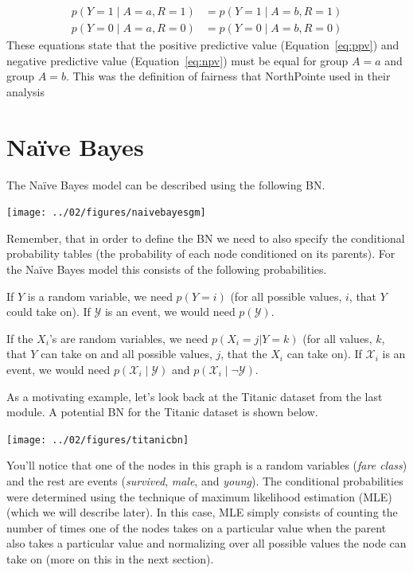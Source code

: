 \documentclass{tufte-handout}
\begin{document}
\begin{align}
p(Y=1 \mid A=a, R=1) &= p(Y=1 \mid A=b, R=1) \label{eq:ppv} \\
p(Y=0 \mid A=a, R=0) &= p(Y=0 \mid A=b, R=0) \label{eq:npv}
\end{align}
These equations state that the positive predictive value (Equation~\ref{eq:ppv}) and negative predictive value (Equation~\ref{eq:npv}) must be equal for group $A=a$ and group $A=b$.  This was the definition of fairness that NorthPointe used in their analysis
\ei

\section{Na\"ive Bayes}

The Na\"ive Bayes model can be described using the following BN.

\begin{center}
\texttt{[image: ../02/figures/naivebayesgm]}
\end{center}

Remember, that in order to define the BN we need to also specify the conditional probability tables (the probability of each node conditioned on its parents).  For the Na\"ive Bayes model this consists of the following probabilities.

\bi
\item If $Y$ is a random variable, we need $p(Y=i)$ (for all possible values, $i$, that $Y$ could take on).  If $\mathcal{Y}$ is an event, we would need $p(\mathcal{Y})$.
\item If the $X_i$'s are random variables, we need $p(X_i=j | Y=k)$ (for all values, $k$, that $Y$ can take on and all possible values, $j$, that the $X_i$ can take on).  If $\mathcal{X}_i$ is an event, we would need $p(\mathcal{X}_i \mid \mathcal{Y})$ and $p(\mathcal{X}_i \mid \neg \mathcal{Y})$.
\ei

As a motivating example, let's look back at the Titanic dataset from the last module.  A potential BN for the Titanic dataset is shown below.

\begin{center}
\texttt{[image: ../02/figures/titanicbn]}
\end{center}

You'll notice that one of the nodes in this graph is a random variables (\emph{fare class}) and the rest are events (\emph{survived}, \emph{male}, and \emph{young}).  The conditional probabilities were determined using the technique of maximum likelihood estimation (MLE) (which we will describe later).  In this case, MLE simply consists of counting the number of times one of the nodes takes on a particular value when the parent also takes a particular value and normalizing over all possible values the node can take on (more on this in the next section).
\end{document}
